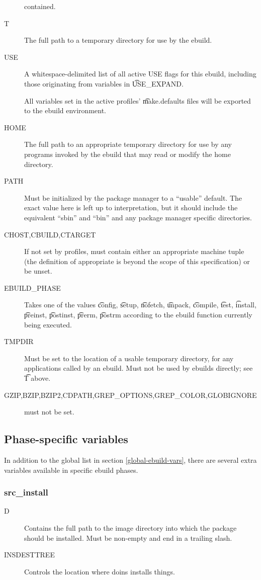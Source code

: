 \begin{description}
    contained. \label{env-var-WORKDIR}
\item[T] The full path to a temporary directory for use by the ebuild.
\item[USE] A whitespace-delimited list of all active USE flags for this ebuild, including those
    originating from variables in \t{USE\_EXPAND}.
\item[] All variables set in the active profiles' \t{make.defaults} files will be exported to the
    ebuild environment.
\item[HOME] The full path to an appropriate temporary directory for use by any programs invoked by
    the ebuild that may read or modify the home directory.
\item[PATH] Must be initialized by the package manager to a ``usable'' default.  The exact value here
    is left up to interpretation, but it should include the equivalent ``sbin'' and ``bin'' and any
    package manager specific directories.
\item[CHOST,CBUILD,CTARGET] If not set by profiles, must contain either an appropriate
    machine tuple (the definition of appropriate is beyond the scope of this specification) or
    be unset.
\item[EBUILD\_PHASE] Takes one of the values \t{config}, \t{setup}, \t{nofetch}, \t{unpack}, \t{compile},
    \t{test}, \t{install}, \t{preinst}, \t{postinst}, \t{prerm}, \t{postrm} according to the ebuild
    function currently being executed.
\item[TMPDIR] Must be set to the location of a usable temporary directory, for any applications
    called by an ebuild. Must not be used by ebuilds directly; see \t{T} above.
\item[GZIP,BZIP,BZIP2,CDPATH,GREP\_OPTIONS,GREP\_COLOR,GLOBIGNORE] must not be set.
\end{description}

\subsection{Phase-specific variables}

In addition to the global list in section \ref{global-ebuild-vars}, there are several extra
variables available in specific ebuild phases.

\subsubsection{src\_install}
\begin{description}
\item[D] Contains the full path to the image directory into which the package should be installed.
    Must be non-empty and end in a trailing slash.
\item[INSDESTTREE] Controls the location where doins installs things.
\end{description}

